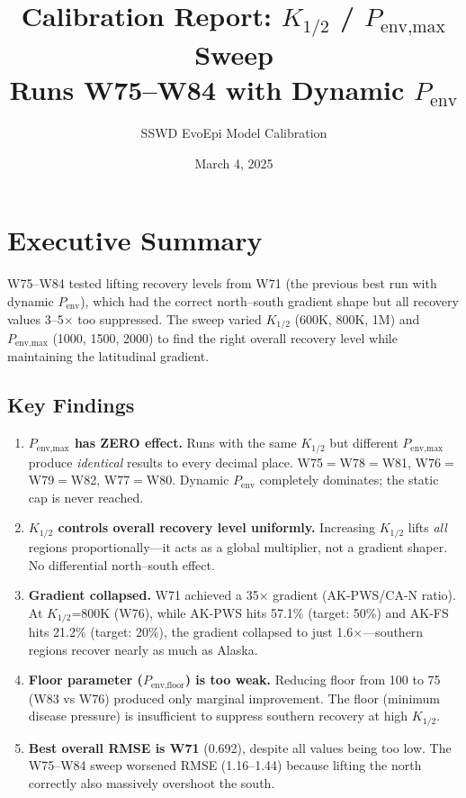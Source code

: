 \documentclass[11pt,a4paper]{article}
\title{\textbf{Calibration Report: $K_{1/2}$ / $P_{\text{env,max}}$ Sweep}\\[0.3em]
\large Runs W75--W84 with Dynamic $P_{\text{env}}$}
\author{SSWD EvoEpi Model Calibration}
\date{March 4, 2025}
\begin{document}
\maketitle
\thispagestyle{fancy}

\section{Executive Summary}

W75--W84 tested lifting recovery levels from W71 (the previous best run with dynamic $P_{\text{env}}$), which had the correct north--south gradient shape but all recovery values 3--5$\times$ too suppressed. The sweep varied $K_{1/2}$ (600K, 800K, 1M) and $P_{\text{env,max}}$ (1000, 1500, 2000) to find the right overall recovery level while maintaining the latitudinal gradient.

\subsection*{Key Findings}

\begin{enumerate}[leftmargin=*]
    \item \textbf{\textcolor{alertred}{$P_{\text{env,max}}$ has ZERO effect.}} Runs with the same $K_{1/2}$ but different $P_{\text{env,max}}$ produce \emph{identical} results to every decimal place. W75$=$W78$=$W81, W76$=$W79$=$W82, W77$=$W80. Dynamic $P_{\text{env}}$ completely dominates; the static cap is never reached.

    \item \textbf{$K_{1/2}$ controls overall recovery level uniformly.} Increasing $K_{1/2}$ lifts \emph{all} regions proportionally---it acts as a global multiplier, not a gradient shaper. No differential north--south effect.

    \item \textbf{Gradient collapsed.} W71 achieved a 35$\times$ gradient (AK-PWS/CA-N ratio). At $K_{1/2}$=800K (W76), while AK-PWS hits 57.1\% (target: 50\%) and AK-FS hits 21.2\% (target: 20\%), the gradient collapsed to just 1.6$\times$---southern regions recover nearly as much as Alaska.

    \item \textbf{Floor parameter ($P_{\text{env,floor}}$) is too weak.} Reducing floor from 100 to 75 (W83 vs W76) produced only marginal improvement. The floor (minimum disease pressure) is insufficient to suppress southern recovery at high $K_{1/2}$.

    \item \textbf{Best overall RMSE is W71} (0.692), despite all values being too low. The W75--W84 sweep worsened RMSE (1.16--1.44) because lifting the north correctly also massively overshoot the south.
\end{enumerate}
\end{document}
